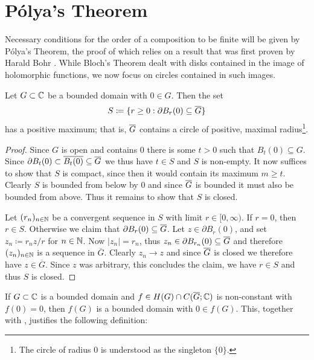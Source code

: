 \section{Pólya's Theorem}
\label{sec:polyas-theorem}

Necessary conditions for the order of a composition to be finite will be given by Pólya's Theorem, the proof of which relies on a result that was first proven by Harald Bohr \cite{segal-complex-analysis}. While Bloch's Theorem dealt with disks contained in the image of holomorphic functions, we now focus on circles contained in such images.

\begin{proposition} \label{prop:existence-circle-maximal-radius}
    Let $G \subset \mathbb{C}$ be a bounded domain with $0 \in G$. Then the set
    \begin{equation} \label{eq:set-circle-maximal-radius}
        S \coloneqq \{ r \geq 0 : \partial B_r(0) \subseteq \overline{G} \}
    \end{equation}
    has a positive maximum; that is, $\overline{G}$ contains a circle of positive, maximal radius\footnote{The circle of radius $0$ is understood as the singleton $\{ 0 \}$.}.
\end{proposition}

\begin{proof}
    Since $G$ is open and contains $0$ there is some $t > 0$ such that $B_t(0) \subseteq G$. Since $\partial B_t(0) \subset \overline{B_t(0)} \subseteq \overline{G}$ we thus have $t \in S$ and $S$ is non-empty. It now suffices to show that $S$ is compact, since then it would contain its maximum $m \geq t$. Clearly $S$ is bounded from below by $0$ and since $\overline{G}$ is bounded it must also be bounded from above. Thus it remains to show that $S$ is closed.

    Let $(r_n)_{n \in \mathbb{N}}$ be a convergent sequence in $S$ with limit $r \in [0, \infty)$. If $r = 0$, then $r \in S$. Otherwise we claim that $\partial B_r(0) \subseteq \overline{G}$. Let $z \in \partial B_r(0)$, and set $z_n \coloneqq r_n z / r$ for $n \in \mathbb{N}$. Now $\vert z_n \vert = r_n$, thus $z_n \in \partial B_{r_n}(0) \subseteq \overline{G}$ and therefore $(z_n)_{n \in \mathbb{N}}$ is a sequence in $\overline{G}$. Clearly $z_n \to z$ and since $\overline{G}$ is closed we therefore have $z \in \overline{G}$. Since $z$ was arbitrary, this concludes the claim, we have $r \in S$ and thus $S$ is closed.
\end{proof}

If $G \subset \mathbb{C}$ is a bounded domain and $f \in H(G) \cap C(\overline{G}; \mathbb{C})$ is non-constant with $f(0) = 0$, then $f(G)$ is a bounded domain with $0 \in f(G)$. This, together with , justifies the following definition:

